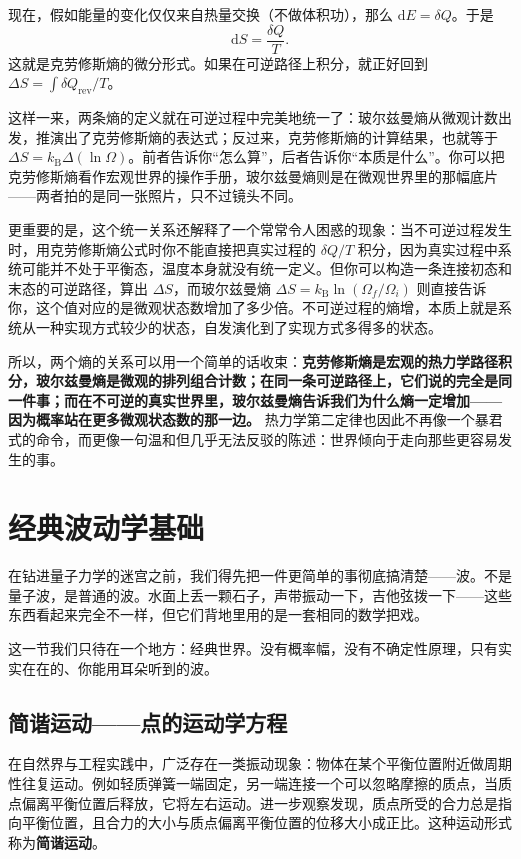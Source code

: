 \documentclass[UTF8]{ctexbook}
\begin{document}
现在，假如能量的变化仅仅来自热量交换（不做体积功），那么 $\mathrm dE = \delta Q$。于是
\[
\mathrm dS = \frac{\delta Q}{T}.
\]
这就是克劳修斯熵的微分形式。如果在可逆路径上积分，就正好回到 $\Delta S = \int \delta Q_{\text{rev}}/T$。

这样一来，两条熵的定义就在可逆过程中完美地统一了：玻尔兹曼熵从微观计数出发，推演出了克劳修斯熵的表达式；反过来，克劳修斯熵的计算结果，也就等于 $\Delta S = k_{\text{B}}\Delta(\ln\Omega)$。前者告诉你“怎么算”，后者告诉你“本质是什么”。你可以把克劳修斯熵看作宏观世界的操作手册，玻尔兹曼熵则是在微观世界里的那幅底片——两者拍的是同一张照片，只不过镜头不同。

更重要的是，这个统一关系还解释了一个常常令人困惑的现象：当不可逆过程发生时，用克劳修斯熵公式时你不能直接把真实过程的 $\delta Q/T$ 积分，因为真实过程中系统可能并不处于平衡态，温度本身就没有统一定义。但你可以构造一条连接初态和末态的可逆路径，算出 $\Delta S$，而玻尔兹曼熵 $\Delta S = k_{\text{B}}\ln(\Omega_f/\Omega_i)$ 则直接告诉你，这个值对应的是微观状态数增加了多少倍。不可逆过程的熵增，本质上就是系统从一种实现方式较少的状态，自发演化到了实现方式多得多的状态。

所以，两个熵的关系可以用一个简单的话收束：\textbf{克劳修斯熵是宏观的热力学路径积分，玻尔兹曼熵是微观的排列组合计数；在同一条可逆路径上，它们说的完全是同一件事；而在不可逆的真实世界里，玻尔兹曼熵告诉我们为什么熵一定增加——因为概率站在更多微观状态数的那一边。} 热力学第二定律也因此不再像一个暴君式的命令，而更像一句温和但几乎无法反驳的陈述：世界倾向于走向那些更容易发生的事。


\newpage
\section{经典波动学基础}

在钻进量子力学的迷宫之前，我们得先把一件更简单的事彻底搞清楚——波。不是量子波，是普通的波。水面上丢一颗石子，声带振动一下，吉他弦拨一下——这些东西看起来完全不一样，但它们背地里用的是一套相同的数学把戏。

这一节我们只待在一个地方：经典世界。没有概率幅，没有不确定性原理，只有实实在在的、你能用耳朵听到的波。



\subsection{简谐运动——点的运动学方程}

在自然界与工程实践中，广泛存在一类振动现象：物体在某个平衡位置附近做周期性往复运动。例如轻质弹簧一端固定，另一端连接一个可以忽略摩擦的质点，当质点偏离平衡位置后释放，它将左右运动。进一步观察发现，质点所受的合力总是指向平衡位置，且合力的大小与质点偏离平衡位置的位移大小成正比。这种运动形式称为\textbf{简谐运动}。
\end{document}
